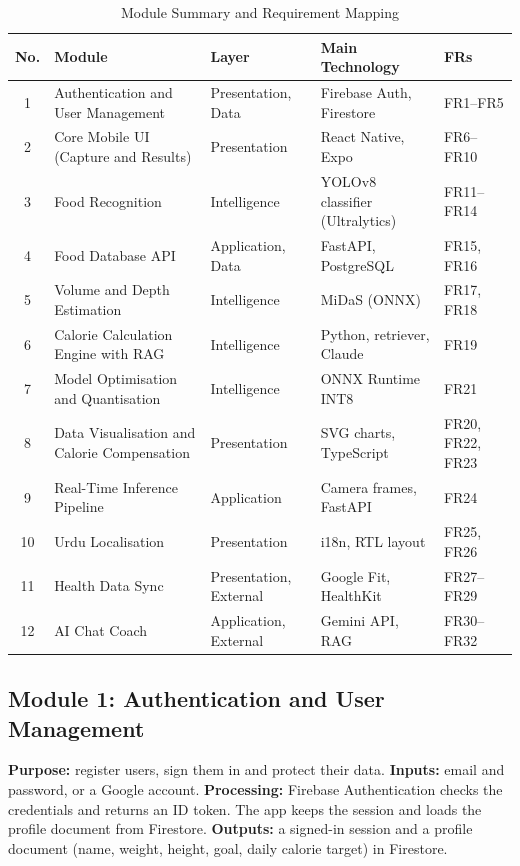 \begin{table}[H]
\centering
\caption{Module Summary and Requirement Mapping}
\label{tab:modules}
\small
\begin{tabularx}{\textwidth}{|c|>{\raggedright\arraybackslash}X|l|>{\raggedright\arraybackslash}X|l|}
\hline
\textbf{No.} & \textbf{Module} & \textbf{Layer} & \textbf{Main Technology} & \textbf{FRs} \\ \hline
1 & Authentication and User Management & Presentation, Data & Firebase Auth, Firestore & FR1--FR5 \\ \hline
2 & Core Mobile UI (Capture and Results) & Presentation & React Native, Expo & FR6--FR10 \\ \hline
3 & Food Recognition & Intelligence & YOLOv8 classifier (Ultralytics) & FR11--FR14 \\ \hline
4 & Food Database API & Application, Data & FastAPI, PostgreSQL & FR15, FR16 \\ \hline
5 & Volume and Depth Estimation & Intelligence & MiDaS (ONNX) & FR17, FR18 \\ \hline
6 & Calorie Calculation Engine with RAG & Intelligence & Python, retriever, Claude & FR19 \\ \hline
7 & Model Optimisation and Quantisation & Intelligence & ONNX Runtime INT8 & FR21 \\ \hline
8 & Data Visualisation and Calorie Compensation & Presentation & SVG charts, TypeScript & FR20, FR22, FR23 \\ \hline
9 & Real-Time Inference Pipeline & Application & Camera frames, FastAPI & FR24 \\ \hline
10 & Urdu Localisation & Presentation & i18n, RTL layout & FR25, FR26 \\ \hline
11 & Health Data Sync & Presentation, External & Google Fit, HealthKit & FR27--FR29 \\ \hline
12 & AI Chat Coach & Application, External & Gemini API, RAG & FR30--FR32 \\ \hline
\end{tabularx}
\end{table}

\subsection{Module 1: Authentication and User Management}
\textbf{Purpose:} register users, sign them in and protect their data. \textbf{Inputs:} email and
password, or a Google account. \textbf{Processing:} Firebase Authentication checks the credentials
and returns an ID token. The app keeps the session and loads the profile document from Firestore.
\textbf{Outputs:} a signed-in session and a profile document (name, weight, height, goal, daily
calorie target) in Firestore.

